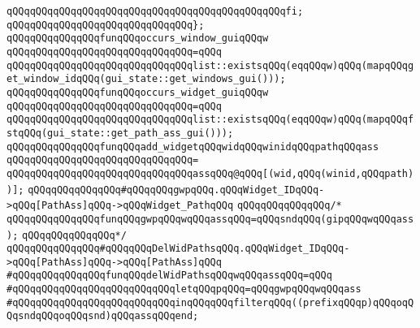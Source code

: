 \verb|qQQqqQQqqQQqqQQqqQQqqQQqqQQqqQQqqQQqqQQqqQQqqQQqfi;|\newline
\verb|qQQqqQQqqQQqqQQqqQQqqQQqqQQqqQQq};|\newline
\newline
\newline
\verb|qQQqqQQqqQQqqQQqfunqQQqoccurs_window_guiqQQqw|\newline
\verb|qQQqqQQqqQQqqQQqqQQqqQQqqQQqqQQq=qQQq|\newline
\verb|qQQqqQQqqQQqqQQqqQQqqQQqqQQqqQQqlist::existsqQQq(eqqQQqw)qQQq(mapqQQqget_window_idqQQq(gui_state::get_windows_gui()));|\newline
\newline
\verb|qQQqqQQqqQQqqQQqfunqQQqoccurs_widget_guiqQQqw|\newline
\verb|qQQqqQQqqQQqqQQqqQQqqQQqqQQqqQQq=qQQq|\newline
\verb|qQQqqQQqqQQqqQQqqQQqqQQqqQQqqQQqlist::existsqQQq(eqqQQqw)qQQq(mapqQQqfstqQQq(gui_state::get_path_ass_gui()));|\newline
\newline
\newline
\verb|qQQqqQQqqQQqqQQqfunqQQqadd_widgetqQQqwidqQQqwinidqQQqpathqQQqass|\newline
\verb|qQQqqQQqqQQqqQQqqQQqqQQqqQQqqQQq=|\newline
\verb|qQQqqQQqqQQqqQQqqQQqqQQqqQQqqQQqassqQQq@qQQq[(wid,qQQq(winid,qQQqpath))];|\newline
\newline
\verb|qQQqqQQqqQQqqQQq#qQQqqQQqgwpqQQq.qQQqWidget_IDqQQq->qQQq[PathAss]qQQq->qQQqWidget_PathqQQq|\newline
\verb|qQQqqQQqqQQqqQQq/*|\newline
\verb|qQQqqQQqqQQqqQQqfunqQQqgwpqQQqwqQQqassqQQq=qQQqsndqQQq(gipqQQqwqQQqass);|\newline
\verb|qQQqqQQqqQQqqQQq*/|\newline
\verb|qQQqqQQqqQQqqQQq#qQQqqQQqDelWidPathsqQQq.qQQqWidget_IDqQQq->qQQq[PathAss]qQQq->qQQq[PathAss]qQQq|\newline
\newline
\verb|#qQQqqQQqqQQqqQQqfunqQQqdelWidPathsqQQqwqQQqassqQQq=qQQq|\newline
\verb|#qQQqqQQqqQQqqQQqqQQqqQQqqQQqletqQQqpqQQq=qQQqgwpqQQqwqQQqass|\newline
\verb|#qQQqqQQqqQQqqQQqqQQqqQQqqQQqinqQQqqQQqfilterqQQq((prefixqQQqp)qQQqoqQQqsndqQQqoqQQqsnd)qQQqassqQQqend;|\newline
\newline
